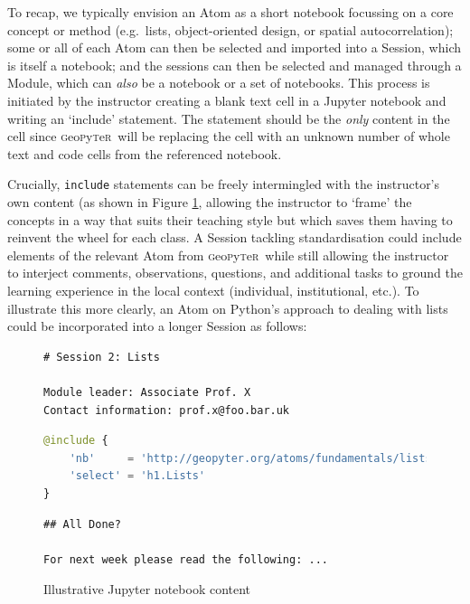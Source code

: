 \documentclass[letter, 11pt,titlepage]{article}
\newcommand{\gp}{\textsc{g}eo\textsc{p}y\textsc{t}e\textsc{r}~\/}
\newcommand{\eg}{e.g.~\/}
\newcommand{\comment}[1]{\todo[inline, color=green!40]{#1}}
\begin{document}
To recap, we typically envision an Atom as a short notebook focussing on a core concept or method (\eg lists, object-oriented design, or spatial autocorrelation); some or all of each Atom can then be selected and imported into a Session, which is itself a notebook; and the sessions can then be selected and managed through a Module, which can \emph{also} be a notebook or a set of notebooks. This process is initiated by the instructor creating a blank text cell in a Jupyter notebook and writing an `include' statement. The statement should be the \emph{only} content in the cell since \gp will be replacing the cell with an unknown number of whole text and code cells from the referenced notebook.

Crucially, \texttt{include} statements can be freely intermingled with the instructor's own content (as shown in Figure \ref{fig:include}, allowing the instructor to `frame' the concepts in a way that suits their teaching style but which saves them having to reinvent the wheel for each class. A Session tackling standardisation could include elements of the relevant Atom from \gp while still allowing the instructor to interject comments, observations, questions, and additional tasks to ground the learning experience in the local context (individual, institutional, etc.). To illustrate this more clearly, an Atom on Python's approach to dealing with lists could be incorporated into a longer Session as follows:

\comment{Convert into a Jupyter-like example.}

\begin{figure}
	\centering 
	\caption{Illustrative Jupyter notebook content}
	\label{fig:include}
\begin{lstlisting}[language=HTML,frame=single]
# Session 2: Lists

Module leader: Associate Prof. X
Contact information: prof.x@foo.bar.uk
\end{lstlisting}	
\begin{lstlisting}[language=Python,frame=single]
@include {
    'nb'     = 'http://geopyter.org/atoms/fundamentals/lists.ipynb',
    'select' = 'h1.Lists'
}
\end{lstlisting}

\begin{lstlisting}[language=HTML,frame=single]
## All Done?

For next week please read the following: ...
\end{lstlisting}

\end{figure}
\end{document}
